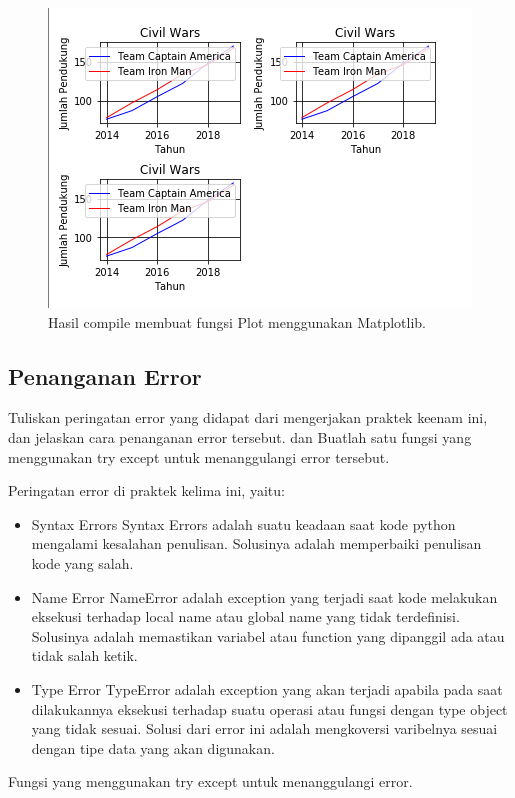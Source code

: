\begin{figure}[H]
	\includegraphics[width=12cm]{figures/6/Praktek/1174039/p4.png}
	\centering
	\caption{Hasil compile membuat fungsi Plot menggunakan Matplotlib.}
\end{figure}


\subsection{Penanganan Error}
Tuliskan  peringatan  error  yang  didapat  dari  mengerjakan  praktek  keenam  ini, dan  jelaskan  cara  penanganan  error  tersebut. dan  Buatlah  satu  fungsi  yang menggunakan try except untuk menanggulangi error tersebut.

\hfill \break
Peringatan error di praktek kelima ini, yaitu:
\begin{itemize}
	\item Syntax Errors
	Syntax Errors adalah suatu keadaan saat kode python mengalami kesalahan penulisan. Solusinya adalah memperbaiki penulisan kode yang salah.
	
	\item Name Error
	NameError adalah exception yang terjadi saat kode melakukan eksekusi terhadap local name atau global name yang tidak terdefinisi. Solusinya adalah memastikan variabel atau function yang dipanggil ada atau tidak salah ketik.
	
	\item Type Error
	TypeError adalah exception yang akan terjadi apabila pada saat dilakukannya eksekusi terhadap suatu operasi atau fungsi dengan type object yang tidak sesuai. Solusi dari error ini adalah mengkoversi varibelnya sesuai dengan tipe data yang akan digunakan.
\end{itemize}
\hfill \break
Fungsi yang menggunakan try except untuk menanggulangi error.

